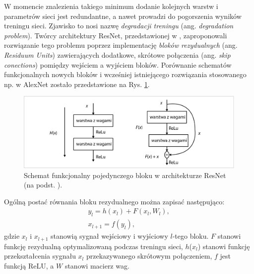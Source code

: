 W momencie znalezienia takiego minimum dodanie kolejnych warstw i parametrów sieci jest redundantne, a nawet prowadzi do pogorszenia wyników treningu sieci. Zjawisko to nosi nazwę \textit{degradacji treningu} (ang. \textit{degradation problem}). Twórcy architektury ResNet, przedstawionej w \cite{ResNet}, zaproponowali rozwiązanie tego problemu poprzez implementację \textit{bloków rezydualnych} (ang. \textit{Residuum Units}) zawierających dodatkowe, skrótowe połączenia (ang. \textit{skip conections}) pomiędzy wejściem a wyjściem bloków. Porównanie schematów funkcjonalnych nowych bloków i wcześniej istniejącego rozwiązania stosowanego np. w AlexNet zostało przedstawione na Rys. \ref{ResNetBlock}.
\begin{figure}[h!]
	\centering
	\includegraphics[width=1\textwidth]{figures/ResidualBlock.png}
	\caption{Schemat funkcjonalny pojedynczego bloku w architekturze ResNet (na podst. \cite{ResNet}).}
	\label{ResNetBlock}
\end{figure} 

Ogólną postać równania bloku rezydualnego można zapisać następująco:
\begin{equation}
\begin{split}
y_l = h(x_l) + F(x_l, W_l),\\
x_{l+1} = f(y_l),
\end{split}
\end{equation}
gdzie $x_l$ i $x_{l+1}$ stanowią sygnał wejściowy i wyjściowy $l$-tego bloku. $F$ stanowi funkcję rezydualną optymalizowaną podczas treningu sieci, $h$($x_l$) stanowi funkcję przekształcenia sygnału $x_l$ przekazywanego skrótowym połączeniem, $f$ jest funkcją ReLU, \linebreak a $W$ stanowi macierz wag.

